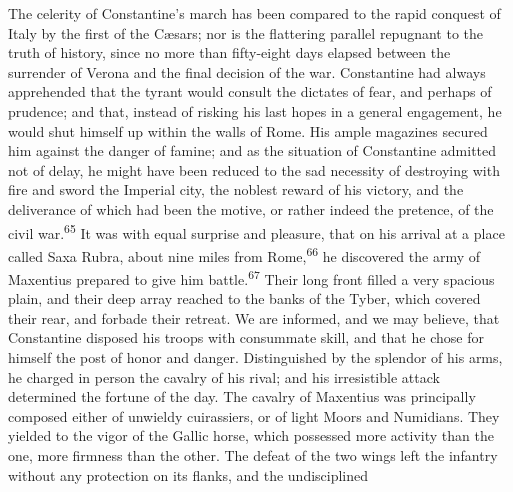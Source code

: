 



The celerity of Constantine’s march has been compared to the
rapid conquest of Italy by the first of the Cæsars; nor is the
flattering parallel repugnant to the truth of history, since no
more than fifty-eight days elapsed between the surrender of
Verona and the final decision of the war. Constantine had always
apprehended that the tyrant would consult the dictates of fear,
and perhaps of prudence; and that, instead of risking his last
hopes in a general engagement, he would shut himself up within
the walls of Rome. His ample magazines secured him against the
danger of famine; and as the situation of Constantine admitted
not of delay, he might have been reduced to the sad necessity of
destroying with fire and sword the Imperial city, the noblest
reward of his victory, and the deliverance of which had been the
motive, or rather indeed the pretence, of the civil war.\textsuperscript{65} It
was with equal surprise and pleasure, that on his arrival at a
place called Saxa Rubra, about nine miles from Rome,\textsuperscript{66} he
discovered the army of Maxentius prepared to give him battle.\textsuperscript{67}
Their long front filled a very spacious plain, and their deep
array reached to the banks of the Tyber, which covered their
rear, and forbade their retreat. We are informed, and we may
believe, that Constantine disposed his troops with consummate
skill, and that he chose for himself the post of honor and
danger. Distinguished by the splendor of his arms, he charged in
person the cavalry of his rival; and his irresistible attack
determined the fortune of the day. The cavalry of Maxentius was
principally composed either of unwieldy cuirassiers, or of light
Moors and Numidians. They yielded to the vigor of the Gallic
horse, which possessed more activity than the one, more firmness
than the other. The defeat of the two wings left the infantry
without any protection on its flanks, and the undisciplined
